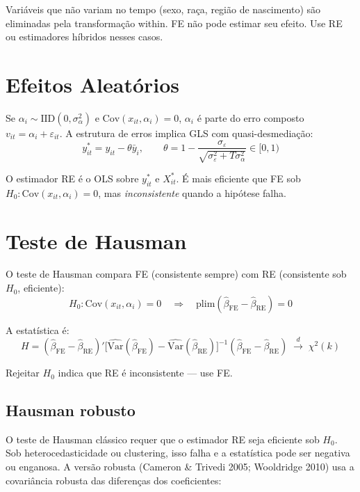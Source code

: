 \begin{aviso}
  Variáveis que não variam no tempo (sexo, raça, região de nascimento) são
  eliminadas pela transformação within. FE não pode estimar seu efeito.
  Use RE ou estimadores híbridos nesses casos.
\end{aviso}

\section{Efeitos Aleatórios}

Se $\alpha_i \sim \mathrm{IID}(0, \sigma^2_\alpha)$ e
$\mathrm{Cov}(x_{it}, \alpha_i) = 0$, $\alpha_i$ é parte do erro composto
$v_{it} = \alpha_i + \varepsilon_{it}$. A estrutura de erros implica GLS com
quasi-desmediação:
\[
  y^*_{it} = y_{it} - \theta\bar{y}_i,
  \qquad
  \theta = 1 - \frac{\sigma_\varepsilon}{\sqrt{\sigma^2_\varepsilon + T\sigma^2_\alpha}}
  \in [0,1)
\]

O estimador RE é o OLS sobre $y^*_{it}$ e $X^*_{it}$. É mais eficiente que
FE sob $H_0: \mathrm{Cov}(x_{it},\alpha_i) = 0$, mas \emph{inconsistente}
quando a hipótese falha.

\section{Teste de Hausman}

O teste de Hausman compara FE (consistente sempre) com RE (consistente sob
$H_0$, eficiente):
\[
  H_0: \mathrm{Cov}(x_{it}, \alpha_i) = 0
  \quad\Longrightarrow\quad
  \mathrm{plim}(\hat\beta_{\mathrm{FE}} - \hat\beta_{\mathrm{RE}}) = 0
\]

A estatística é:
\[
  H = (\hat\beta_{\mathrm{FE}} - \hat\beta_{\mathrm{RE}})'
      \bigl[\widehat{\mathrm{Var}}(\hat\beta_{\mathrm{FE}}) -
             \widehat{\mathrm{Var}}(\hat\beta_{\mathrm{RE}})\bigr]^{-1}
      (\hat\beta_{\mathrm{FE}} - \hat\beta_{\mathrm{RE}})
  \;\xrightarrow{d}\; \chi^2(k)
\]

Rejeitar $H_0$ indica que RE é inconsistente — use FE.

\subsection{Hausman robusto}

O teste de Hausman clássico requer que o estimador RE seja eficiente sob
$H_0$. Sob heterocedasticidade ou clustering, isso falha e a estatística
pode ser negativa ou enganosa. A versão robusta
(Cameron \& Trivedi 2005; Wooldridge 2010) usa a covariância robusta das
diferenças dos coeficientes:


